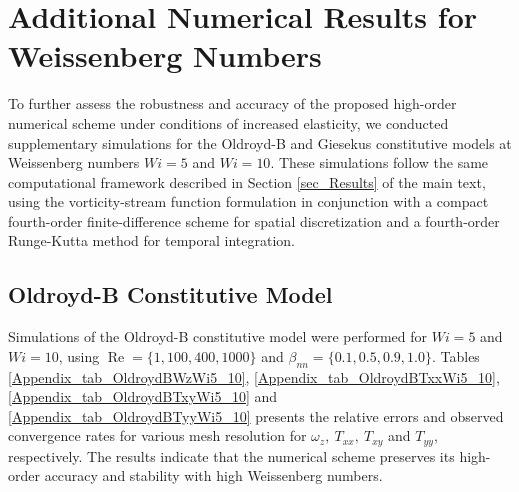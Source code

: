 \documentclass[preprint, 12pt]{elsarticle}
\begin{document}
{\color{red}
\appendix
\section{Additional Numerical Results for Weissenberg Numbers}\label{Appendix_more_wi}

To further assess the robustness and accuracy of the proposed high-order numerical scheme under conditions of increased elasticity, we conducted supplementary simulations for the Oldroyd-B and Giesekus constitutive models at Weissenberg numbers $Wi = 5$ and $Wi = 10$. These simulations follow the same computational framework described in Section \ref{sec_Results} of the main text, using the vorticity-stream function formulation in conjunction with a compact fourth-order finite-difference scheme for spatial discretization and a fourth-order Runge-Kutta method for temporal integration.

\subsection{Oldroyd-B Constitutive Model}
\label{Appendix_more_wi_oldroydb}

Simulations of the Oldroyd-B constitutive model were performed for $Wi = 5$ and $Wi = 10$, using $\operatorname{Re}=\{1,100,400,1000\}$ and $\beta_{nn}=\{0.1,0.5,0.9,1.0\}$. Tables \ref{Appendix_tab_OldroydBWzWi5_10}, \ref{Appendix_tab_OldroydBTxxWi5_10}, \ref{Appendix_tab_OldroydBTxyWi5_10} and \ref{Appendix_tab_OldroydBTyyWi5_10} presents the relative errors and observed convergence rates for various mesh resolution for $\omega_z,\ T_{xx},\ T_{xy}$ and $T_{yy}$, respectively. The results indicate that the numerical scheme preserves its high-order accuracy and stability with high Weissenberg numbers.

}
\end{document}
